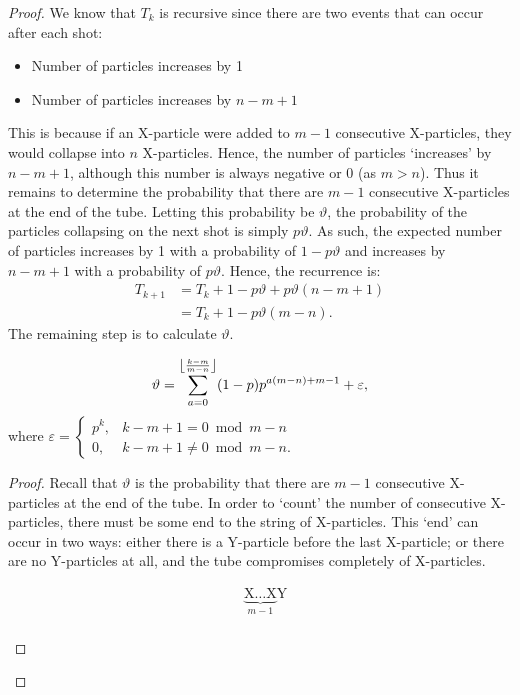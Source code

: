 \begin{proof}
  We know that $T_k$ is recursive since there are two events that can occur after each shot:
  \begin{itemize}
    \item Number of particles increases by 1
    \item Number of particles increases by $n-m+1$
  \end{itemize}
  This is because if an X-particle were added to $m-1$ consecutive X-particles, they would collapse into $n$ X-particles. Hence, the number of particles `increases' by $n-m+1$, although this number is always negative or 0 (as $m > n$). Thus it remains to determine the probability that there are $m-1$ consecutive X-particles at the end of the tube. Letting this probability be $\vartheta$, the probability of the particles collapsing on the next shot is simply $p\vartheta$. As such, the expected number of particles increases by 1 with a probability of  $1-p\vartheta$ and increases by  $n-m+1$ with a probability of $p\vartheta$. Hence, the recurrence is:
  \begin{align}
    T_{k+1} &= T_{k} + 1 - p\vartheta + p\vartheta(n-m+1) \nonumber \\
            &= T_{k} + 1 - p\vartheta(m-n). \label{eq:1}
  \end{align}
  The remaining step is to calculate $\vartheta$.
  \begin{claim}
    \begin{equation*}
      \vartheta = \sum_{a=0}^{\floor*{\frac{k-m}{m-n}}} (1-p)p^{a(m-n)+m-1} + \varepsilon,
    \end{equation*}
    where $\varepsilon = \begin{cases} p^{k}, &k-m+1 = 0 \bmod m-n \\ 0, &k-m+1 \neq 0 \bmod m-n. \end{cases}$
  \end{claim}
  \begin{proof}
    Recall that $\vartheta$ is the probability that there are $m-1$ consecutive X-particles at the end of the tube. In order to `count' the number of consecutive X-particles, there must be some end to the string of X-particles. This `end' can occur in two ways: either there is a Y-particle before the last X-particle; or there are no Y-particles at all, and the tube compromises completely of X-particles.
    \begin{figure}[H]
      \vspace{-1.5em}
      \begin{align*}
        &\underbrace{\text{X}\dots\text{X}}_{m-1}\text{Y} \tag{A}\\

\end{align*}
\end{figure}
\end{proof}
\end{proof}
